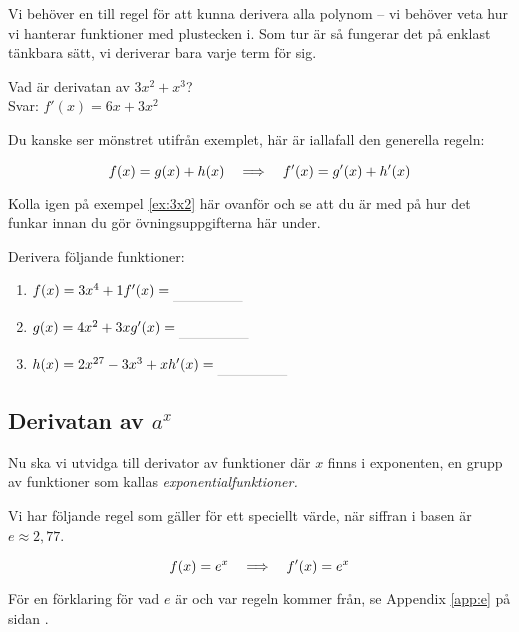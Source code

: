\documentclass[a4paper, 12pt]{article}
\begin{document}
Vi behöver en till regel för att kunna derivera alla polynom -- vi behöver veta hur vi hanterar funktioner med plustecken i. Som tur är så fungerar det på enklast tänkbara sätt, vi deriverar bara varje term för sig.

\begin{exempel}
    \label{ex:3x2}
    Vad är derivatan av $3x^2 + x^3$? \\ Svar: $f'(x) = 6x + 3x^2$
\end{exempel}

Du kanske ser mönstret utifrån exemplet, här är iallafall den generella regeln:

\begin{regel}
    \label{reg:sum}
    \[ f(x) = g(x) + h(x) \hspace{1em} \Longrightarrow \hspace{1em} f'(x) = g'(x) + h'(x) \] 
\end{regel}

Kolla igen på exempel \ref*{ex:3x2} här ovanför och se att du är med på hur det funkar innan du gör övningsuppgifterna här under.

\begin{uppgifter}
    Derivera följande funktioner:
    \begin{multicols}{3}
        \begin{enumerate}
            \item $f(x) = 3x^4 + 1 \\ f'(x) \ans$
            \item $g(x) = 4x^2 + 3x \\ g'(x) \ans$
            \item $h(x) = 2x^{27} - 3x^3 + x \\ h'(x) \ans$
        \end{enumerate}
    \end{multicols}
\end{uppgifter}

\subsection{Derivatan av $a^x$}
Nu ska vi utvidga till derivator av funktioner där $x$ finns i exponenten, en grupp av funktioner som kallas \emph{exponentialfunktioner.}

Vi har följande regel som gäller för ett speciellt värde, när siffran i basen är $e \approx 2,77$.

\begin{regel}
    \[f(x) = e^x \hspace{1em} \Longrightarrow \hspace{1em} f'(x) = e^x \]
\end{regel}

För en förklaring för vad $e$ är och var regeln kommer från, se Appendix \ref*{app:e} på sidan \pageref*{app:e}.
\end{document}
